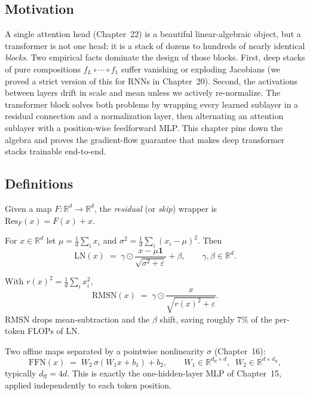 \subsection*{Motivation}

A single attention head (Chapter~22) is a beautiful linear-algebraic object, but a transformer is not one head: it is a stack of dozens to hundreds of nearly identical \emph{blocks}. Two empirical facts dominate the design of those blocks. First, deep stacks of pure compositions $f_L \circ \cdots \circ f_1$ suffer vanishing or exploding Jacobians (we proved a strict version of this for RNNs in Chapter~20). Second, the activations between layers drift in scale and mean unless we actively re-normalize. The transformer block solves both problems by wrapping every learned sublayer in a residual connection and a normalization layer, then alternating an attention sublayer with a position-wise feedforward MLP. This chapter pins down the algebra and proves the gradient-flow guarantee that makes deep transformer stacks trainable end-to-end.

\subsection*{Definitions}

\begin{definition}
Given a map $F : \mathbb{R}^d \to \mathbb{R}^d$, the \emph{residual} (or \emph{skip}) wrapper is $\mathrm{Res}_F(x) = F(x) + x$.
\end{definition}

\begin{definition}
For $x \in \mathbb{R}^d$ let $\mu = \tfrac1d \sum_i x_i$ and $\sigma^2 = \tfrac1d \sum_i (x_i - \mu)^2$. Then
\[
  \mathrm{LN}(x) \;=\; \gamma \odot \frac{x - \mu \mathbf{1}}{\sqrt{\sigma^2 + \varepsilon}} + \beta,
  \qquad \gamma, \beta \in \mathbb{R}^d.
\]
\end{definition}

\begin{definition}
With $r(x)^2 = \tfrac1d \sum_i x_i^2$,
\[
  \mathrm{RMSN}(x) \;=\; \gamma \odot \frac{x}{\sqrt{r(x)^2 + \varepsilon}}.
\]
RMSN drops mean-subtraction and the $\beta$ shift, saving roughly $7\%$ of the per-token FLOPs of LN.
\end{definition}

\begin{definition}
Two affine maps separated by a pointwise nonlinearity $\sigma$ (Chapter~16):
\[
  \mathrm{FFN}(x) \;=\; W_2 \,\sigma(W_1 x + b_1) + b_2,
  \qquad W_1 \in \mathbb{R}^{d_{\mathrm{ff}} \times d}, \;\; W_2 \in \mathbb{R}^{d \times d_{\mathrm{ff}}},
\]
typically $d_{\mathrm{ff}} = 4d$. This is exactly the one-hidden-layer MLP of Chapter~15, applied independently to each token position.
\end{definition}

